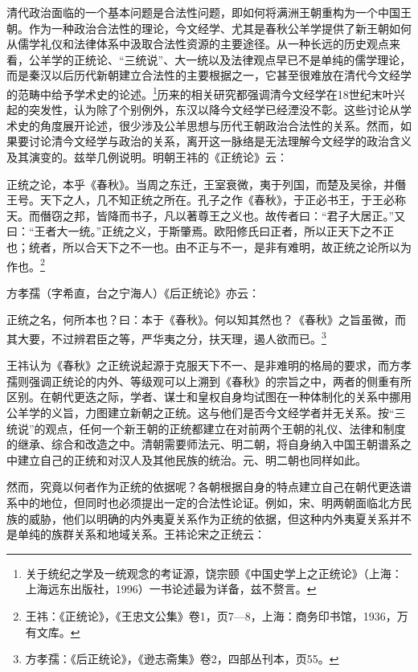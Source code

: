 \documentclass[a4paper, 12pt, openright]{ctexbook}
\renewenvironment{quote}
  {\list{}{\rightmargin2\ccwd \leftmargin2\ccwd \itemindent=2\ccwd \listparindent=2\ccwd}%
   \item\relax\small\kaishu\color{black}}
  {\endlist}
\begin{document}
清代政治面临的一个基本问题是合法性问题，即如何将满洲王朝重构为一个中国王朝。作为一种政治合法性的理论，今文经学、尤其是春秋公羊学提供了新王朝如何从儒学礼仪和法律体系中汲取合法性资源的主要途径。从一种长远的历史观点来看，公羊学的正统论、“三统说”、大一统以及法律观点早已不是单纯的儒学理论，而是秦汉以后历代新朝建立合法性的主要根据之一，它甚至很难放在清代今文经学的范畴中给予学术史的论述。\footnote{关于统纪之学及一统观念的考证源，饶宗颐《中国史学上之正统论》（上海：上海远东出版社，1996）一书论述最为详备，兹不赘言。}历来的相关研究都强调清今文经学在18世纪末叶兴起的突发性，认为除了个别例外，东汉以降今文经学已经湮没不彰。这些讨论从学术史的角度展开论述，很少涉及公羊思想与历代王朝政治合法性的关系。然而，如果要讨论清今文经学与政治的关系，离开这一脉络是无法理解今文经学的政治含义及其演变的。兹举几例说明。明朝王祎的《正统论》云：

\begin{quote}
正统之论，本乎《春秋》。当周之东迁，王室衰微，夷于列国，而楚及吴徐，并僭王号。天下之人，几不知正统之所在。孔子之作《春秋》，于正必书王，于王必称天。而僭窃之邦，皆降而书子，凡以著尊王之义也。故传者曰：“君子大居正。”又曰：“王者大一统。”正统之义，于斯肇焉。欧阳修氏曰正者，所以正天下之不正也；统者，所以合天下之不一也。由不正与不一，是非有难明，故正统之论所以为作也。\footnote{王祎：《正统论》，《王忠文公集》卷1，页7—8，上海：商务印书馆，1936，万有文库。}
\end{quote}

方孝孺（字希直，台之宁海人）《后正统论》亦云：

\begin{quote}
正统之名，何所本也？曰：本于《春秋》。何以知其然也？《春秋》之旨虽微，而其大要，不过辨君臣之等，严华夷之分，扶天理，遏人欲而已。\footnote{方孝孺：《后正统论》，《逊志斋集》卷2，四部丛刊本，页55。}
\end{quote}

王祎认为《春秋》之正统说起源于克服天下不一、是非难明的格局的要求，而方孝孺则强调正统论的内外、等级观可以上溯到《春秋》的宗旨之中，两者的侧重有所区别。在朝代更迭之际，学者、谋士和皇权自身均试图在一种体制化的关系中挪用公羊学的义旨，力图建立新朝之正统。这与他们是否今文经学者并无关系。按“三统说”的观点，任何一个新王朝的正统都建立在对前两个王朝的礼仪、法律和制度的继承、综合和改造之中。清朝需要师法元、明二朝，将自身纳入中国王朝谱系之中建立自己的正统和对汉人及其他民族的统治。元、明二朝也同样如此。

然而，究竟以何者作为正统的依据呢？各朝根据自身的特点建立自己在朝代更迭谱系中的地位，但同时也必须提出一定的合法性论证。例如，宋、明两朝面临北方民族的威胁，他们以明确的内外夷夏关系作为正统的依据，但这种内外夷夏关系并不是单纯的族群关系和地域关系。王祎论宋之正统云：
\end{document}
